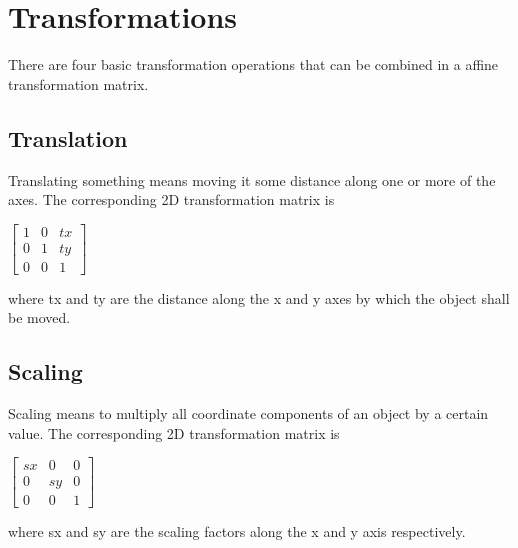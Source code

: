 
\section{Transformations}
\label{apdx-transformations}

There are four basic transformation operations that can be combined in a affine transformation matrix. 

\subsection{Translation}
Translating something means moving it some distance along one or more of the axes. The corresponding 2D transformation matrix is

\hspace*{0.4cm}
\begin{center}
\begin{math}\left[ \begin{array}{ccc} 1 & 0 & tx \\ 0 & 1 & ty \\ 0 & 0 & 1\end{array}\right]\end{math}
\end{center}
\hspace*{0.4cm}

where tx and ty are the distance along the x and y axes by which the object shall be moved.

\subsection{Scaling}
Scaling means to multiply all coordinate components of an object by a certain value.
The corresponding 2D transformation matrix is

\hspace*{0.4cm}
\begin{center}
\begin{math}\left[ \begin{array}{ccc} sx & 0 & 0 \\ 0 & sy & 0 \\ 0 & 0 & 1\end{array}\right]\end{math}
\end{center}
\hspace*{0.4cm}

where sx and sy are the scaling factors along the x and y axis respectively.

